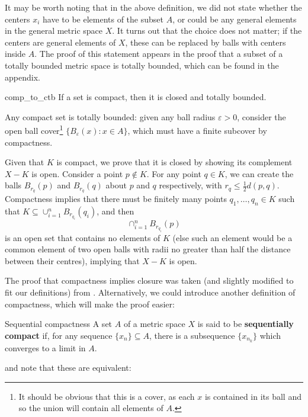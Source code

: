 It may be worth noting that in the above definition, we did not state whether the centers $x_{i}$ have to be elements of the subset $A$, or could be any general elements in the general metric space $X$. It turns out that the choice does not matter; if the centers are general elements of $X$, these can be replaced by balls with centers inside $A$. The proof of this statement appears in the proof that a subset of a totally bounded metric space is totally bounded, which can be found in the appendix.

\begin{bprop}{}{comp_to_ctb}
If a set is compact, then it is closed and totally bounded.
\end{bprop}

\begin{bproof}{}{}
Any compact set is totally bounded: given any ball radius $\varepsilon > 0$, consider the open ball cover\footnote{It should be obvious that this is a cover, as each $x$ is contained in its ball and so the union will contain all elements of $A$.} \mbox{$\{ B_{\varepsilon}(x) : x\in A\}$}, which must have a finite subcover by compactness. 

Given that $K$ is compact, we prove that it is closed by showing its complement $X - K$ is open. Consider a point $p\not\in K$. For any point $q \in K$, we can create the balls $B_{r_{q}}(p)$ and $B_{r_{q}}(q)$ about $p$ and $q$ respectively, with $r_{q} \leq \frac{1}{2} d(p,q)$. Compactness implies that there must be finitely many points $q_{1}, \ldots, q_{n} \in K$ such that $K \subseteq \cup_{i=1}^{n} B_{r_{q_{i}}}(q_{i}) $, and then \[ \cap_{i=1}^{n} B_{r_{q_{i}}} (p) \] is an open set that contains no elements of $K$ (else such an element would be a common element of two open balls with radii no greater than half the distance between their centres), implying that $X - K$ is open. 
\eop
\end{bproof}

The proof that compactness implies closure was taken (and slightly modified to fit our definitions) from \cite{rudin}. Alternatively, we could introduce another definition of compactness, which will make the proof easier:
\begin{bdefin}{Sequential compactness}{}
A set $A$ of a metric space $X$ is said to be \textbf{sequentially compact} if, for any sequence $\{x_{n} \} \subseteq A$, there is a subsequence $\{ x_{n_{k}} \}$ which converges to a limit in $A$.
\end{bdefin}

and note that these are equivalent:

